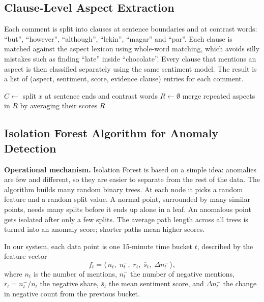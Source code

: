 \documentclass[12pt,a4paper]{report}
\newcommand{\be}{\begin{equation}}
\newcommand{\ee}{\end{equation}}
\begin{document}
\subsection{Clause-Level Aspect Extraction}

Each comment is split into clauses at sentence boundaries and at contrast words: ``but'', ``however'', ``although'', ``lekin'', ``magar'' and ``par''. Each clause is matched against the aspect lexicon using whole-word matching, which avoids silly mistakes such as finding ``late'' inside ``chocolate''. Every clause that mentions an aspect is then classified separately using the same sentiment model. The result is a list of (aspect, sentiment, score, evidence clause) entries for each comment.

\begin{algorithm}[H]
\caption{Clause-Level Aspect-Based Sentiment}
$C \leftarrow$ split $x$ at sentence ends and contrast words\;
$R \leftarrow \emptyset$\;
merge repeated aspects in $R$ by averaging their scores\;
\Return $R$\;
\end{algorithm}

\subsection{Isolation Forest Algorithm for Anomaly Detection}

\textbf{Operational mechanism.} Isolation Forest \cite{liu2008} is based on a simple idea: anomalies are few and different, so they are easier to separate from the rest of the data. The algorithm builds many random binary trees. At each node it picks a random feature and a random split value. A normal point, surrounded by many similar points, needs many splits before it ends up alone in a leaf. An anomalous point gets isolated after only a few splits. The average path length across all trees is turned into an anomaly score; shorter paths mean higher scores.

In our system, each data point is one 15-minute time bucket $t$, described by the feature vector
\be
f_t = \big\langle\, n_t,\; n^-_t,\; r_t,\; \bar{s}_t,\; \Delta n^-_t \,\big\rangle,
\ee
where $n_t$ is the number of mentions, $n^-_t$ the number of negative mentions, $r_t = n^-_t / n_t$ the negative share, $\bar{s}_t$ the mean sentiment score, and $\Delta n^-_t$ the change in negative count from the previous bucket.
\end{document}
